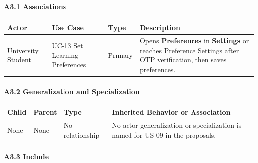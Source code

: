 \documentclass[12pt]{article}
\renewcommand{\baselinestretch}{1.5}
\begin{document}
\hypertarget{sec:a3-1-associations}{}
\paragraph*{A3.1 Associations}
\par\medskip

\begingroup
\small
\renewcommand{\baselinestretch}{1.0}\selectfont
\renewcommand{\arraystretch}{1.15}
\setlength{\tabcolsep}{6pt}
\begin{longtable}{|>{\raggedright\arraybackslash}p{}|>{\raggedright\arraybackslash}p{}|>{\raggedright\arraybackslash}p{}|>{\raggedright\arraybackslash}p{}|}
\hline
\textbf{Actor} & \textbf{Use Case} & \textbf{Type} & \textbf{Description} \\ \hline
\endhead
University Student & UC-13 Set Learning Preferences & Primary & Opens \textbf{Preferences} in \textbf{Settings} or reaches Preference Settings after OTP verification, then saves preferences. \\ \hline
\end{longtable}
\endgroup
\par\medskip

\hypertarget{sec:a3-2-generalization-and-specialization}{}
\paragraph*{A3.2 Generalization and Specialization}
\par\medskip

\begingroup
\small
\renewcommand{\baselinestretch}{1.0}\selectfont
\renewcommand{\arraystretch}{1.15}
\setlength{\tabcolsep}{6pt}
\begin{longtable}{|>{\raggedright\arraybackslash}p{}|>{\raggedright\arraybackslash}p{}|>{\raggedright\arraybackslash}p{}|>{\raggedright\arraybackslash}p{}|}
\hline
\textbf{Child} & \textbf{Parent} & \textbf{Type} & \textbf{Inherited Behavior or Association} \\ \hline
\endhead
None & None & No relationship & No actor generalization or specialization is named for US-09 in the proposals. \\ \hline
\end{longtable}
\endgroup
\par\medskip

\hypertarget{sec:a3-3-include}{}
\paragraph*{A3.3 Include}
\par\medskip
\end{document}
